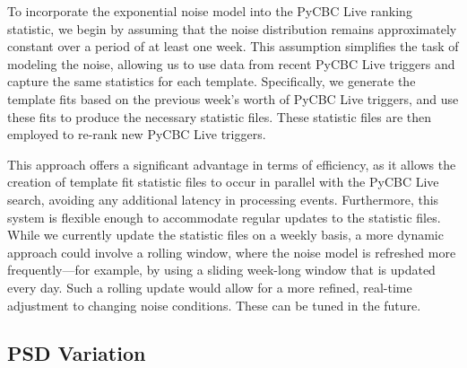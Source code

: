 
To incorporate the exponential noise model into the PyCBC Live ranking statistic, we begin by assuming that the noise distribution remains approximately constant over a period of at least one week. This assumption simplifies the task of modeling the noise, allowing us to use data from recent PyCBC Live triggers and capture the same statistics for each template. Specifically, we generate the template fits based on the previous week’s worth of PyCBC Live triggers, and use these fits to produce the necessary statistic files. These statistic files are then employed to re-rank new PyCBC Live triggers.

This approach offers a significant advantage in terms of efficiency, as it allows the creation of template fit statistic files to occur in parallel with the PyCBC Live search, avoiding any additional latency in processing \gwadj events. Furthermore, this system is flexible enough to accommodate regular updates to the statistic files. While we currently update the statistic files on a weekly basis, a more dynamic approach could involve a rolling window, where the noise model is refreshed more frequently---for example, by using a sliding week-long window that is updated every day. Such a rolling update would allow for a more refined, real-time adjustment to changing noise conditions. These can be tuned in the future.

\subsection{\label{5:sec:psd-var}PSD Variation}

